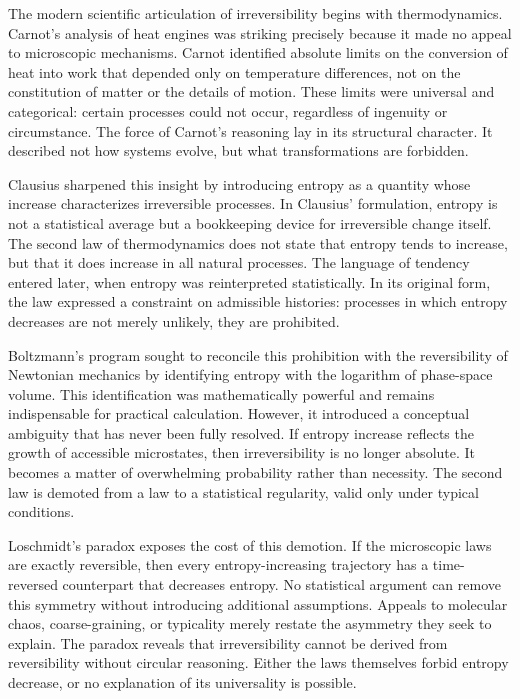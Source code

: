\documentclass[11pt,oneside]{book}
\begin{document}
The modern scientific articulation of irreversibility begins with thermodynamics. Carnot’s analysis of heat engines was striking precisely because it made no appeal to microscopic mechanisms. Carnot identified absolute limits on the conversion of heat into work that depended only on temperature differences, not on the constitution of matter or the details of motion. These limits were universal and categorical: certain processes could not occur, regardless of ingenuity or circumstance. The force of Carnot’s reasoning lay in its structural character. It described not how systems evolve, but what transformations are forbidden.

Clausius sharpened this insight by introducing entropy as a quantity whose increase characterizes irreversible processes. In Clausius’ formulation, entropy is not a statistical average but a bookkeeping device for irreversible change itself. The second law of thermodynamics does not state that entropy tends to increase, but that it does increase in all natural processes. The language of tendency entered later, when entropy was reinterpreted statistically. In its original form, the law expressed a constraint on admissible histories: processes in which entropy decreases are not merely unlikely, they are prohibited.

Boltzmann’s program sought to reconcile this prohibition with the reversibility of Newtonian mechanics by identifying entropy with the logarithm of phase-space volume. This identification was mathematically powerful and remains indispensable for practical calculation. However, it introduced a conceptual ambiguity that has never been fully resolved. If entropy increase reflects the growth of accessible microstates, then irreversibility is no longer absolute. It becomes a matter of overwhelming probability rather than necessity. The second law is demoted from a law to a statistical regularity, valid only under typical conditions.

Loschmidt’s paradox exposes the cost of this demotion. If the microscopic laws are exactly reversible, then every entropy-increasing trajectory has a time-reversed counterpart that decreases entropy. No statistical argument can remove this symmetry without introducing additional assumptions. Appeals to molecular chaos, coarse-graining, or typicality merely restate the asymmetry they seek to explain. The paradox reveals that irreversibility cannot be derived from reversibility without circular reasoning. Either the laws themselves forbid entropy decrease, or no explanation of its universality is possible.
\end{document}
